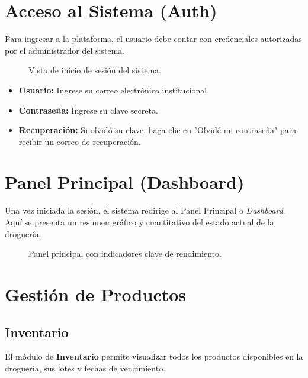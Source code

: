 \documentclass[a4paper, 12pt]{article}
\begin{document}
\section{Acceso al Sistema (Auth)}
Para ingresar a la plataforma, el usuario debe contar con credenciales autorizadas por el administrador del sistema.

\begin{figure}[H]
    \centering
    \caption{Vista de inicio de sesión del sistema.}
\end{figure}

\begin{itemize}
    \item \textbf{Usuario:} Ingrese su correo electrónico institucional.
    \item \textbf{Contraseña:} Ingrese su clave secreta.
    \item \textbf{Recuperación:} Si olvidó su clave, haga clic en "Olvidé mi contraseña" para recibir un correo de recuperación.
\end{itemize}

\section{Panel Principal (Dashboard)}
Una vez iniciada la sesión, el sistema redirige al Panel Principal o \textit{Dashboard}. Aquí se presenta un resumen gráfico y cuantitativo del estado actual de la droguería.

\begin{figure}[H]
    \centering
    \caption{Panel principal con indicadores clave de rendimiento.}
\end{figure}

\section{Gestión de Productos}

\subsection{Inventario}
El módulo de \textbf{Inventario} permite visualizar todos los productos disponibles en la droguería, sus lotes y fechas de vencimiento.
\end{document}

